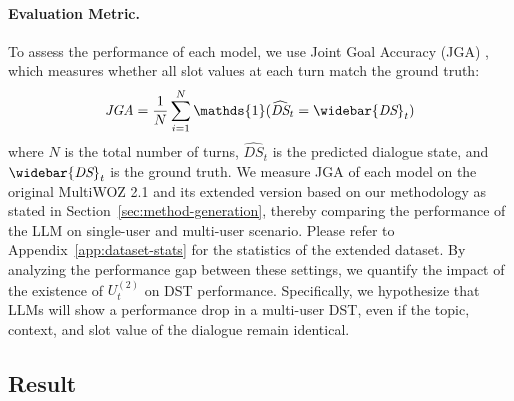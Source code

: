 \documentclass[11pt]{article}
\begin{document}
\paragraph{Evaluation Metric.} To assess the performance of each model, we use Joint Goal Accuracy (JGA) \cite{henderson2014second}, which measures whether all slot values at each turn match the ground truth:
\begin{equation}
\textit{JGA} = \frac{1}{N} \sum^{N}_{i=1}\mathds{1}(\widehat{\textit{DS}}_t=\widebar{\textit{DS}}_t)
\end{equation}
where $N$ is the total number of turns, $\widehat{\textit{DS}}_t$ is the predicted dialogue state, and $\widebar{\textit{DS}}_t$ is the ground truth. We measure JGA of each model on the original MultiWOZ 2.1 \cite{eric2020multiwoz} and its extended version based on our methodology as stated in Section~\ref{sec:method-generation}, thereby comparing the performance of the LLM on single-user and multi-user scenario. Please refer to Appendix~\ref{app:dataset-stats} for the statistics of the extended dataset. By analyzing the performance gap between these settings, we quantify the impact of the existence of $U^{(2)}_{t}$ on DST performance. Specifically, we hypothesize that LLMs will show a performance drop in a multi-user DST, even if the topic, context, and slot value of the dialogue remain identical.

\subsection{Result}
\label{sec:experiment-result}
\end{document}

